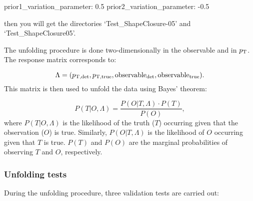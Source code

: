 \documentclass[12pt]{article}
\begin{document}
\begin{tcolorbox}
\begin{verbnobox}[\scriptsize]
prior1_variation_parameter: 0.5
prior2_variation_parameter: -0.5
\end{verbnobox}  
\end{tcolorbox}

then you will get the directories `Test\_ShapeClosure-05' and `Test\_ShapeClosure05'.

The unfolding procedure is done two-dimensionally in the observable and in $p_{\rm T}$.
The response matrix corresponds to:

\begin{equation}
\Lambda = (p_{\rm T, det}, p_{\rm T, true}, {\rm observable_{det}}, {\rm observable_{true}}).
\end{equation}
This matrix is then used to unfold the data using Bayes' theorem:

\begin{equation}
P(T|O,\Lambda) = \frac{P(O|T,\Lambda) \cdot P(T)}{P(O)},
\end{equation}
where $P(T|O,\Lambda)$ is the likelihood of the truth ($T$) occurring given that the observation ($O$) is true.
Similarly, $P(O|T,\Lambda)$ is the likelihood of $O$ occurring given that $T$ is true.
$P(T)$ and $P(O)$ are the marginal probabilities of observing $T$ and $O$, respectively.

\subsubsection{Unfolding tests}

During the unfolding procedure, three validation tests are carried out:
\end{document}
